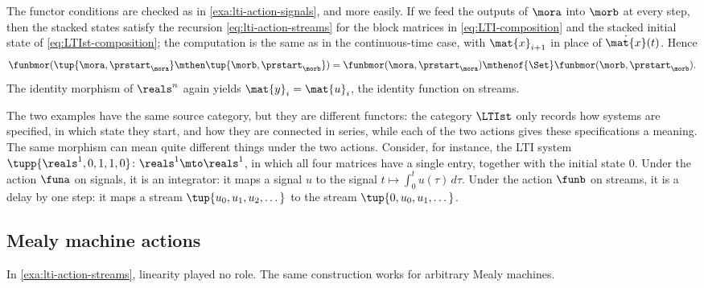 \begin{example}
    The functor conditions are checked as in \cref{exa:lti-action-signals}, and more easily.
    If we feed the outputs of $\mora$ into $\morb$ at every step, then the stacked states satisfy the recursion \cref{eq:lti-action-streams} for the block matrices in \cref{eq:LTI-composition} and the stacked initial state of \cref{eq:LTIst-composition}; the computation is the same as in the continuous-time case, with $\mat{x}_{i+1}$ in place of $\dot{\mat{x}}(t)$.
    Hence
    \begin{equation}
        \funbmor(\tup{\mora, \prstart_\mora} \mthen \tup{\morb, \prstart_\morb}) = \funbmor(\mora, \prstart_\mora) \mthenof{\Set} \funbmor(\morb, \prstart_\morb).
    \end{equation}
    The identity morphism of $\reals^n$ again yields $\mat{y}_i = \mat{u}_i$, the identity function on streams.
\end{example}

The two examples have the same source category, but they are different functors: the category $\LTIst$ only records how systems are specified, in which state they start, and how they are connected in series, while each of the two actions gives these specifications a meaning.
The same morphism can mean quite different things under the two actions.
Consider, for instance, the LTI system $\tupp{\reals^1, 0, 1, 1, 0} \colon \reals^1 \mto \reals^1$, in which all four matrices have a single entry, together with the initial state $0$.
Under the action $\funa$ on signals, it is an integrator: it maps a signal $u$ to the signal $t \mapsto \int_0^t u(\tau) \, d\tau$.
Under the action $\funb$ on streams, it is a delay by one step: it maps a stream $\tup{u_0, u_1, u_2, \dots}$ to the stream $\tup{0, u_0, u_1, \dots}$.

\subsection{Mealy machine actions}

In \cref{exa:lti-action-streams}, linearity played no role.
The same construction works for arbitrary Mealy machines.

